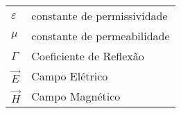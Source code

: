 \begin{longtable}{ll}
$\varepsilon$ & constante de permissividade\\
$\mu$ & constante de permeabilidade \\
$\Gamma$ & Coeficiente de Reflexão\\
$\overrightarrow{E}$ & Campo Elétrico\\
$\overrightarrow{H}$ & Campo Magnético \newline
\end{longtable}

